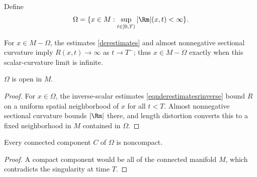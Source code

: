\begin{definition}
  \label{def:kl-structure-at-first-singularity-time-bounded-curvature-regular-set}

Define
\begin{equation}
\Omega=\{x\in M:\sup_{t\in[0,T)}|\Rm|(x,t)<\infty\}.
\end{equation}
\end{definition}

For $x\in M-\Omega$, the estimates \eqref{derestimates} and almost
nonnegative sectional curvature imply $R(x,t)\to\infty$ as $t\to T^-$;
thus $x\in M-\Omega$ exactly when this scalar-curvature limit is infinite.

\begin{lemma}
  \label{lem:kl-structure-at-first-singularity-time-structure-at-first-singularity-time-lemma}
 \label{omegaopen}
$\Omega$ is open in $M$.
\end{lemma}
\begin{proof}
\sketch For $x\in\Omega$, the inverse-scalar estimates
\eqref{eqnderestimatesrinverse} bound $R$ on a uniform spatial neighborhood of
$x$ for all $t<T$. Almost nonnegative sectional curvature bounds $|\Rm|$ there,
and length distortion converts this to a fixed neighborhood in $M$ contained
in $\Omega$.
\end{proof}

\begin{lemma}
  \label{lem:kl-structure-at-first-singularity-time-compactness-structure-at-first-singularity-time}
 \label{omeganoncompact}
Every connected component $C$ of $\Omega$ is noncompact.
\end{lemma}
\begin{proof}
\sketch A compact component would be all of the connected manifold $M$, which
contradicts the singularity at time $T$.
\end{proof}

